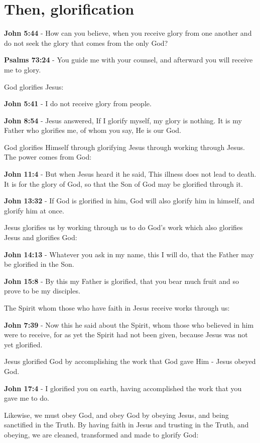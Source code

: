 \documentclass[11pt]{article}
\begin{document}
\section{Then, glorification}
\label{sec:orgd6b5199}
\textbf{John 5:44} - How can you believe, when you receive glory from one another and do not seek the glory that comes from the only God?

\textbf{Psalms 73:24} - You guide me with your counsel, and afterward you will receive me to glory.

God glorifies Jesus:

\textbf{John 5:41} - I do not receive glory from people.

\textbf{John 8:54} - Jesus answered, If I glorify myself, my glory is nothing. It is my Father who glorifies me, of whom you say, He is our God.

God glorifies Himself through glorifying Jesus through working through Jesus. The power comes from God:

\textbf{John 11:4} - But when Jesus heard it he said, This illness does not lead to death. It is for the glory of God, so that the Son of God may be glorified through it.

\textbf{John 13:32} - If God is glorified in him, God will also glorify him in himself, and glorify him at once.

Jesus glorifies us by working through us to do God's work which also glorifies Jesus and glorifies God:

\textbf{John 14:13} - Whatever you ask in my name, this I will do, that the Father may be glorified in the Son.

\textbf{John 15:8} - By this my Father is glorified, that you bear much fruit and so prove to be my disciples.

The Spirit whom those who have faith in Jesus receive works through us:

\textbf{John 7:39} - Now this he said about the Spirit, whom those who believed in him were to receive, for as yet the Spirit had not been given, because Jesus was not yet glorified.

Jesus glorified God by accomplishing the work that God gave Him - Jesus obeyed God.

\textbf{John 17:4} - I glorified you on earth, having accomplished the work that you gave me to do.

Likewise, we must obey God, and obey God by obeying Jesus, and being sanctified in the Truth. By having faith in Jesus and trusting in the Truth, and obeying, we are cleaned, transformed and made to glorify God:
\end{document}
